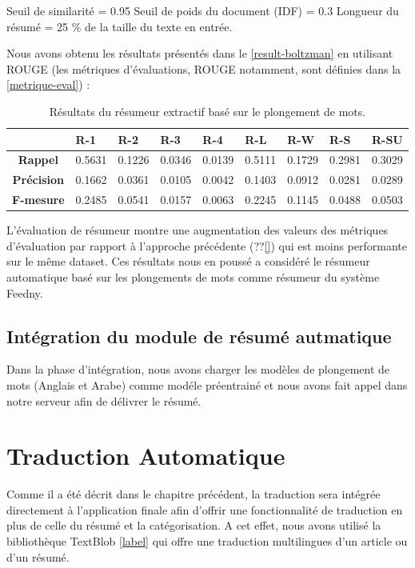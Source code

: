 Seuil de similarité = 0.95
Seuil de poids du document (IDF) = 0.3
Longueur du résumé = 25 \% de la taille du texte en entrée.

Nous avons obtenu les résultats présentés dans le \autoref{result-boltzman} en utilisant ROUGE (les métriques d'évaluations, ROUGE notamment, sont définies dans la \autoref{metrique-eval}) : 

\begin{table}[H]
    \begin{center}
        \begin{tabular}{|c|C{1.2cm}|C{1.2cm}|C{1.2cm}|C{1.2cm}|C{1.2cm}|C{1.2cm}|C{1.2cm}|C{1.2cm}|}
             & \textbf{R-1} &  \textbf{R-2} &  \textbf{R-3} &  \textbf{R-4} &  \textbf{R-L} &  \textbf{R-W} &  \textbf{R-S} &  \textbf{R-SU} \\
            \hline
            \textbf{Rappel} & 0.5631 & 0.1226 & 0.0346 & 0.0139 & 0.5111 & 0.1729 & 0.2981 & 0.3029 \\
            \textbf{Précision} & 0.1662 & 0.0361 & 0.0105 & 0.0042 & 0.1403 & 0.0912 & 0.0281 & 0.0289 \\
            \textbf{F-mesure} & 0.2485 & 0.0541 & 0.0157 & 0.0063 & 0.2245 & 0.1145 & 0.0488 & 0.0503 \\
            \hline
        \end{tabular}
    \end{center}
    \caption{Résultats du résumeur extractif basé sur le plongement de mots.}
    \label{result-boltzman}
\end{table}
L'évaluation de résumeur montre une augmentation des valeurs des métriques d'évaluation par rapport à l'approche précédente (??\autoref{}) qui est moins performante sur le même dataset. Ces résultats nous en poussé a considéré le résumeur automatique basé sur les plongements de mots comme résumeur du système \textquotedbl Feedny\textquotedbl.

\subsection{Intégration du module de résumé autmatique}
Dans la phase d'intégration, nous avons charger les modèles de plongement de mots (Anglais et Arabe) comme modéle préentrainé et nous avons fait appel dans notre serveur afin de délivrer le résumé.


\section{Traduction Automatique}
Comme il a été décrit dans le chapitre précédent, la traduction sera intégrée directement à l'application finale afin d'offrir une fonctionnalité de traduction en plus de celle du résumé et la catégorisation. A cet effet, nous avons utilisé la bibliothèque TextBlob \autoref{label} qui offre une traduction multilingues d'un article ou d'un résumé.

